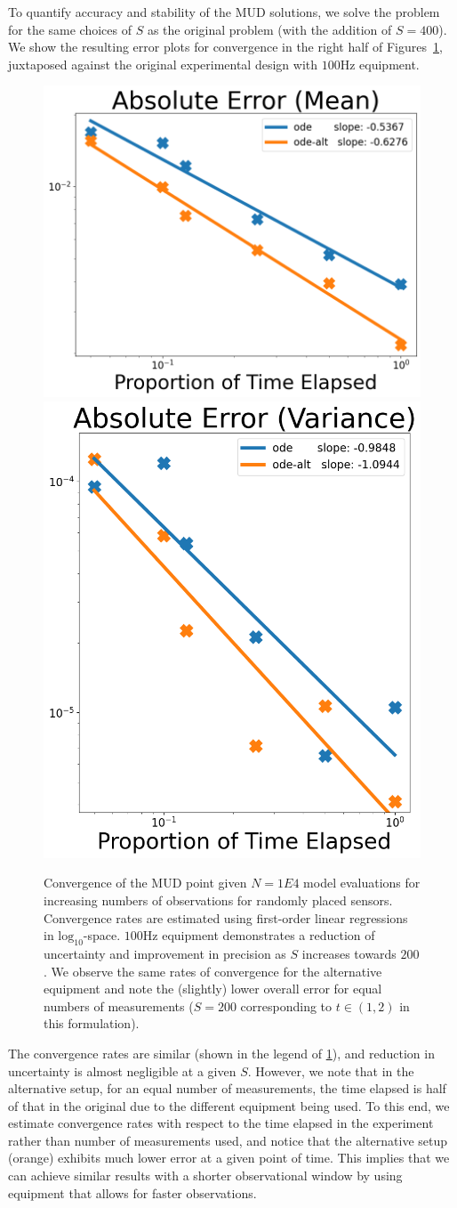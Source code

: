 To quantify accuracy and stability of the MUD solutions, we solve the problem for the same choices of $S$ as the original problem (with the addition of $S=400$).
We show the resulting error plots for convergence in the right half of Figures~\ref{fig:ode-convergence-obs}, juxtaposed against the original experimental design with $100$Hz equipment.

\begin{figure}[htbp]
  \centering
  \includegraphics[width=0.475\linewidth]{figures/ode/ode_convergence_mud_obs_mean}
  \includegraphics[width=0.425\linewidth]{figures/ode/ode_convergence_mud_obs_var}

  \caption{Convergence of the MUD point given $N=1E4$ model evaluations for increasing numbers of observations for randomly placed sensors.
  Convergence rates are estimated using first-order linear regressions in $\text{log}_{10}$-space.
  $100$Hz equipment demonstrates a reduction of uncertainty and improvement in precision as $S$ increases towards $200$.
  We observe the same rates of convergence for the alternative equipment and note the (slightly) lower overall error for equal numbers of measurements ($S=200$ corresponding to $t\in (1,2)$ in this formulation).
  }
  \label{fig:ode-convergence-obs}
\end{figure}

The convergence rates are similar (shown in the legend of \ref{fig:ode-convergence-obs}), and reduction in uncertainty is almost negligible at a given $S$.
However, we note that in the alternative setup, for an equal number of measurements, the time elapsed is half of that in the original due to the different equipment being used.
To this end, we estimate convergence rates with respect to the time elapsed in the experiment rather than number of measurements used, and notice that the alternative setup (orange) exhibits much lower error at a given point of time.
This implies that we can achieve similar results with a shorter observational window by using equipment that allows for faster observations.



